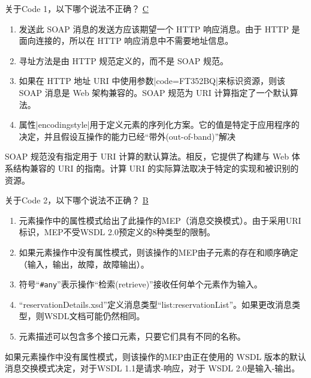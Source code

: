 \begin{problem}
关于Code 1，以下哪个说法不正确？
\uline{C}
    \begin{enumerate}[label=\Alph*.]
        \item 发送此 SOAP 消息的发送方应该期望一个 HTTP 响应消息。由于 HTTP 是面向连接的，所以在 HTTP 响应消息中不需要地址信息。
        \item 寻址方法是由 HTTP 规范定义的，而不是 SOAP 规范。
        \item 如果在 HTTP 地址 URI 中使用参数\sverb|code=FT352BQ|\;来标识资源，则该 SOAP 消息是 Web 架构兼容的。SOAP 规范为 URI 计算指定了一个默认算法。
        \item 属性\sverb|encodingstyle|\;用于定义元素的序列化方案。它的值是特定于应用程序的决定，并且假设互操作的能力已经“带外(out-of-band)”解决
    \end{enumerate}
\end{problem}

\begin{solution}
SOAP 规范没有指定用于 URI 计算的默认算法。相反，它提供了构建与 Web 体系结构兼容的 URI 的指南。计算 URI 的实际算法取决于特定的实现和被识别的资源。
\end{solution}


\begin{problem}
关于Code 2，以下哪个说法不正确？
\uline{B}
    \begin{enumerate}[label=\Alph*.]
        \item 元素操作中的属性模式给出了此操作的MEP（消息交换模式）。由于采用URI标识，MEP不受WSDL 2.0预定义的8种类型的限制。
        \item 如果元素操作中没有属性模式，则该操作的MEP由子元素的存在和顺序确定（输入，输出，故障，故障输出）。
        \item 符号“\verb|#any|”表示操作“检索(retrieve)”接收任何单个元素作为输入。
        \item “reservationDetails.xsd”定义消息类型“list:reservationList”。如果更改消息类型，则WSDL文档可能仍然相同。
        \item 元素描述可以包含多个接口元素，只要它们具有不同的名称。
    \end{enumerate}
\end{problem}

\begin{solution}
如果元素操作中没有属性模式，则该操作的MEP由正在使用的 WSDL 版本的默认消息交换模式决定，对于WSDL 1.1是请求-响应，对于 WSDL 2.0是输入-输出。
\end{solution}


